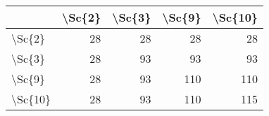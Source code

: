 \begin{tabular}{lrrrr}
\toprule
{} &  \textbackslash Sc\{2\} &  \textbackslash Sc\{3\} &  \textbackslash Sc\{9\} &  \textbackslash Sc\{10\} \\
\midrule
\textbackslash Sc\{2\}  &      28 &      28 &      28 &       28 \\
\textbackslash Sc\{3\}  &      28 &      93 &      93 &       93 \\
\textbackslash Sc\{9\}  &      28 &      93 &     110 &      110 \\
\textbackslash Sc\{10\} &      28 &      93 &     110 &      115 \\
\bottomrule
\end{tabular}
